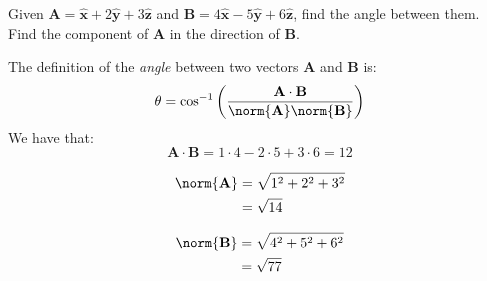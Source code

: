 \documentclass[crop=false,class=book,oneside]{standalone}
\begin{document}
            \begin{problem}
                Given
                $\mathbf{A}%
                 =\hat{\mathbf{x}}+2\hat{\mathbf{y}}%
                 +3\hat{\mathbf{z}}$
                and
                $\mathbf{B}%
                 =4\hat{\mathbf{x}}-5\hat{\mathbf{y}}%
                 +6\hat{\mathbf{z}}$,
                find the angle between them. Find the component of
                $\mathbf{A}$ in the direction of $\mathbf{B}$.
            \end{problem}
            \begin{solution}
                The definition of the \textit{angle}
                between two vectors
                $\mathbf{A}$ and $\mathbf{B}$ is:
                \begin{equation}
                    \theta=
                    \cos^{-1}\bigg(
                        \frac{\mathbf{A}\cdot\mathbf{B}}
                        {\norm{\mathbf{A}}\norm{\mathbf{B}}}
                    \bigg)
                \end{equation}
                We have that:
                \begin{equation}
                    \mathbf{A}\cdot\mathbf{B}
                    =1\cdot4-2\cdot5+3\cdot6=12
                \end{equation}
                \begin{minipage}{0.49\textwidth}
                    \centering
                    \begin{subequations}
                        \begin{align}
                            \norm{\mathbf{A}}
                            &=\sqrt{1^{2}+2^{2}+3^{2}}\\
                            &=\sqrt{14}
                        \end{align}
                    \end{subequations}
                \end{minipage}
                \hfill
                \begin{minipage}{0.49\textwidth}
                    \centering
                    \begin{subequations}
                        \begin{align}
                            \norm{\mathbf{B}}
                            &=\sqrt{4^{2}+5^{2}+6^{2}}\\
                            &=\sqrt{77}
                        \end{align}

\end{subequations}
\end{minipage}
\end{solution}
\end{document}
